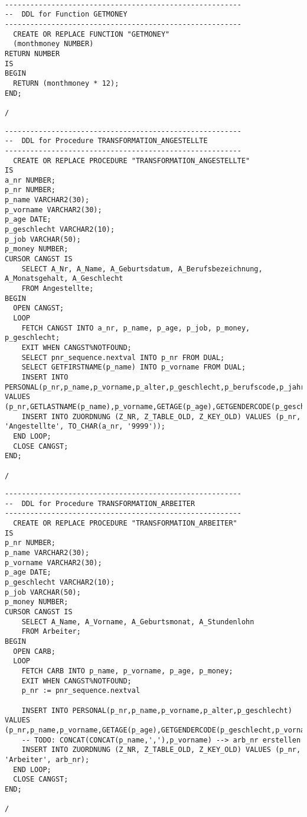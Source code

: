\documentclass{scrartcl}
\begin{document}
\begin{lstlisting}

--------------------------------------------------------
--  DDL for Function GETMONEY
--------------------------------------------------------
  CREATE OR REPLACE FUNCTION "GETMONEY" 
  (monthmoney NUMBER)
RETURN NUMBER
IS
BEGIN
  RETURN (monthmoney * 12);
END;

/
\end{lstlisting}

\begin{lstlisting}
--------------------------------------------------------
--  DDL for Procedure TRANSFORMATION_ANGESTELLTE
--------------------------------------------------------
  CREATE OR REPLACE PROCEDURE "TRANSFORMATION_ANGESTELLTE" 
IS
a_nr NUMBER;
p_nr NUMBER;
p_name VARCHAR2(30);
p_vorname VARCHAR2(30);
p_age DATE;
p_geschlecht VARCHAR2(10);
p_job VARCHAR(50);
p_money NUMBER;
CURSOR CANGST IS
	SELECT A_Nr, A_Name, A_Geburtsdatum, A_Berufsbezeichnung, A_Monatsgehalt, A_Geschlecht
	FROM Angestellte;
BEGIN
  OPEN CANGST;
  LOOP 
    FETCH CANGST INTO a_nr, p_name, p_age, p_job, p_money, p_geschlecht;
    EXIT WHEN CANGST%NOTFOUND;
    SELECT pnr_sequence.nextval INTO p_nr FROM DUAL;
    SELECT GETFIRSTNAME(p_name) INTO p_vorname FROM DUAL;
  	INSERT INTO PERSONAL(p_nr,p_name,p_vorname,p_alter,p_geschlecht,p_berufscode,p_jahreseinkommen) VALUES (p_nr,GETLASTNAME(p_name),p_vorname,GETAGE(p_age),GETGENDERCODE(p_geschlecht,p_vorname),GETJOBCODE(p_job),GETMONEY(p_money));
    INSERT INTO ZUORDNUNG (Z_NR, Z_TABLE_OLD, Z_KEY_OLD) VALUES (p_nr, 'Angestellte', TO_CHAR(a_nr, '9999'));
  END LOOP; 
  CLOSE CANGST;
END;

/
\end{lstlisting}

\begin{lstlisting}
--------------------------------------------------------
--  DDL for Procedure TRANSFORMATION_ARBEITER
--------------------------------------------------------
  CREATE OR REPLACE PROCEDURE "TRANSFORMATION_ARBEITER" 
IS
p_nr NUMBER;
p_name VARCHAR2(30);
p_vorname VARCHAR2(30);
p_age DATE;
p_geschlecht VARCHAR2(10);
p_job VARCHAR(50);
p_money NUMBER;
CURSOR CANGST IS
	SELECT A_Name, A_Vorname, A_Geburtsmonat, A_Stundenlohn
	FROM Arbeiter;
BEGIN
  OPEN CARB;
  LOOP 
	FETCH CARB INTO p_name, p_vorname, p_age, p_money;
	EXIT WHEN CANGST%NOTFOUND;
	p_nr := pnr_sequence.nextval
  	
  	INSERT INTO PERSONAL(p_nr,p_name,p_vorname,p_alter,p_geschlecht) VALUES (p_nr,p_name,p_vorname,GETAGE(p_age),GETGENDERCODE(p_geschlecht,p_vorname),GETJOBCODE(p_job),GETMONEY(p_money));
	-- TODO: CONCAT(CONCAT(p_name,','),p_vorname) --> arb_nr erstellen
	INSERT INTO ZUORDNUNG (Z_NR, Z_TABLE_OLD, Z_KEY_OLD) VALUES (p_nr, 'Arbeiter', arb_nr);
  END LOOP; 
  CLOSE CANGST;
END;

/
\end{lstlisting}
\end{document}
